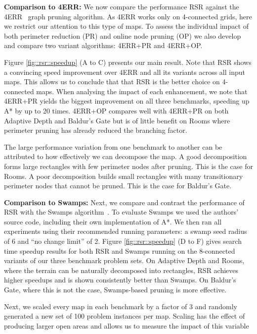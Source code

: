 

\textbf{Comparison to 4ERR: }
We now compare the performance RSR against the 4ERR~\cite{harabor10} graph
pruning algorithm.  As 4ERR works only on
4-connected grids, here we restrict our attention to this type of maps.  To
assess the individual impact of both perimeter reduction (PR) and online node
pruning (OP) we also develop and compare two variant algorithms: 4ERR+PR and
4ERR+OP. 
\par
Figure \ref{fig::rsr::speedup} (A to C) presents our main result.
Note that RSR shows a convincing 
speed improvement over 4ERR and all its variants across all input maps.
This allows us to conclude that that RSR is the better choice on 4-connected maps.
When analysing the impact of each enhancement, we note that 4ERR+PR yields the
biggest improvement on all three benchmarks, speeding up A* by up to 20 times.
4ERR+OP compares well with 4ERR+PR on both Adaptive Depth and
Baldur's Gate but is of little benefit on Rooms where perimeter pruning has
already reduced the branching factor.
\par
The large performance variation from one benchmark to another can be attributed
to how effectively we can decompose the map. A good decomposition forms large
rectangles with few perimeter nodes after pruning. This is the case for Rooms.
A poor decomposition builds small rectangles with many transitionary perimeter 
nodes that cannot be pruned. This is the case for Baldur's Gate. 
\par
\textbf{Comparison to Swamps:}
Next, we compare and contrast the performance of RSR with the Swamps
algorithm~\cite{pochter10}.  To evaluate Swamps we used the authors' source
code, including their own implementation of A*.  We then ran all experiments
using their recommended running parameters: a swamp seed radius of 6 and ``no
change limit'' of 2.
Figure \ref{fig::rsr::speedup} (D to F) gives search time speedup results for both RSR
and Swamps running on the 8-connected variants of our three benchmark problem
sets. 
On Adaptive Depth and Rooms, where the terrain can be naturally decomposed into
rectangles, RSR achieves higher speedups and is shown consistently better than Swamps. 
On Baldur's Gate, where this is not the case, Swamps-based pruning is more
effective. 
\par
Next, we scaled every map in each benchmark by a factor of 3 and randomly
generated a new set of 100 problem instances per map.  Scaling has the effect of
producing larger open areas and allows us to measure the impact of this variable
